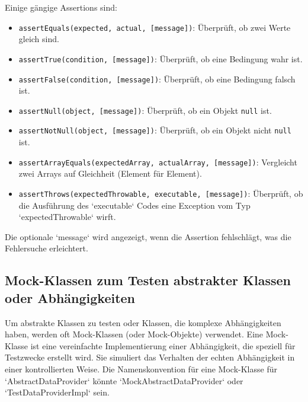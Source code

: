 Einige gängige Assertions sind:
\begin{itemize}
    \item \texttt{assertEquals(expected, actual, [message])}: Überprüft, ob zwei Werte gleich sind.
    \item \texttt{assertTrue(condition, [message])}: Überprüft, ob eine Bedingung wahr ist.
    \item \texttt{assertFalse(condition, [message])}: Überprüft, ob eine Bedingung falsch ist.
    \item \texttt{assertNull(object, [message])}: Überprüft, ob ein Objekt \texttt{null} ist.
    \item \texttt{assertNotNull(object, [message])}: Überprüft, ob ein Objekt nicht \texttt{null} ist.
    \item \texttt{assertArrayEquals(expectedArray, actualArray, [message])}: Vergleicht zwei Arrays auf Gleichheit (Element für Element).
    \item \texttt{assertThrows(expectedThrowable, executable, [message])}: Überprüft, ob die Ausführung des `executable` Codes eine Exception vom Typ `expectedThrowable` wirft.
\end{itemize}
Die optionale `message` wird angezeigt, wenn die Assertion fehlschlägt, was die Fehlersuche erleichtert.

\subsection{Mock-Klassen zum Testen abstrakter Klassen oder Abhängigkeiten}
\label{ssec:junit_mock_klassen}
Um abstrakte Klassen zu testen oder Klassen, die komplexe Abhängigkeiten haben, werden oft Mock-Klassen (oder Mock-Objekte) verwendet. Eine Mock-Klasse ist eine vereinfachte Implementierung einer Abhängigkeit, die speziell für Testzwecke erstellt wird. Sie simuliert das Verhalten der echten Abhängigkeit in einer kontrollierten Weise.
Die Namenskonvention für eine Mock-Klasse für `AbstractDataProvider` könnte `MockAbstractDataProvider` oder `TestDataProviderImpl` sein.

